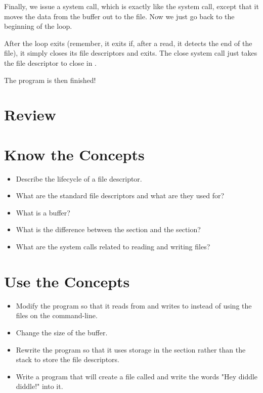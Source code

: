 Finally, we issue a  system call, which is exactly
like the  system call, except that it moves the
data from the buffer out to the file.  Now we just go back to the beginning
of the loop.

After the loop exits (remember, it exits if, after a read, it detects the
end of the file), it simply closes its file descriptors and exits.  The
close system call just takes the file descriptor to close in {\ebxRegIdx}.

The program is then finished!



\section{Review}

\section{Know the Concepts}

\begin{itemize}\item Describe the lifecycle of a file descriptor. 
\item What are the standard file descriptors and what are they used for? 
\item What is a buffer? 
\item What is the difference between the  section and the  section? 
\item What are the system calls related to reading and writing files? 
\end{itemize}

\section{Use the Concepts}

\begin{itemize}\item Modify the  program so that it reads from  and writes to  instead of using the files on the command-line. 
\item Change the size of the buffer. 
\item Rewrite the program so that it uses storage in the  section rather than the stack to store the file descriptors. 
\item Write a program that will create a file called  and write the words "Hey diddle diddle!" into it. 
\end{itemize}

